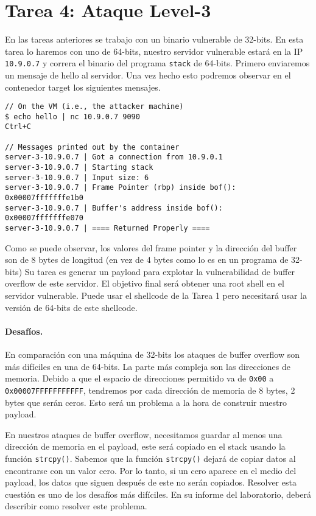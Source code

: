 \section{Tarea 4: Ataque Level-3} 

En las tareas anteriores se trabajo con un binario vulnerable de 32-bits. En esta tarea lo haremos con uno de 64-bits, nuestro servidor vulnerable estará en la IP \texttt{10.9.0.7} y correra el binario del programa  \texttt{stack} de 64-bits.
Primero enviaremos un mensaje de hello al servidor.
Una vez hecho esto podremos observar en el contenedor target los siguientes mensajes.

\begin{lstlisting}
// On the VM (i.e., the attacker machine)
$ echo hello | nc 10.9.0.7 9090
Ctrl+C

// Messages printed out by the container
server-3-10.9.0.7 | Got a connection from 10.9.0.1
server-3-10.9.0.7 | Starting stack
server-3-10.9.0.7 | Input size: 6
server-3-10.9.0.7 | Frame Pointer (rbp) inside bof():  0x00007fffffffe1b0
server-3-10.9.0.7 | Buffer's address inside bof():     0x00007fffffffe070
server-3-10.9.0.7 | ==== Returned Properly ====
\end{lstlisting}

Como se puede observar, los valores del frame pointer y la dirección del buffer son de 8 bytes de longitud (en vez de 4 bytes como lo es en un programa de 32-bits)
Su tarea es generar un payload para explotar la vulnerabilidad de buffer overflow de este servidor.
El objetivo final será obtener una root shell en el servidor vulnerable. Puede usar el shellcode de la Tarea 1 pero necesitará usar la versión de 64-bits de este shellcode.


\paragraph{Desafíos.} En comparación con una máquina de 32-bits los ataques de buffer overflow son más difíciles en una de 64-bits. La parte más compleja son las direcciones de memoria. Debido a que el espacio de direcciones permitido va de \texttt{0x00} a \texttt{0x00007FFFFFFFFFFF}, tendremos por cada dirección de memoria de 8 bytes, 2 bytes que serán ceros.
Esto será un problema a la hora de construir nuestro payload.

En nuestros ataques de buffer overflow, necesitamos guardar al menos una dirección de memoria en el payload, este será copiado en el stack usando la función \texttt{strcpy()}. Sabemos que la función \texttt{strcpy()} dejará de copiar datos al encontrarse con un valor cero. Por lo tanto, si un cero
aparece en el medio del payload, los datos que siguen después de este no serán copiados. Resolver esta cuestión es uno de los desafíos más difíciles.
En su informe del laboratorio, deberá describir como resolver este problema.


